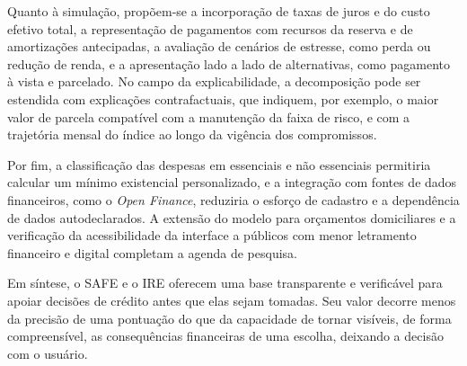 \documentclass[portuguese]{sbc2025}%
\begin{document}
Quanto à simulação, propõem-se a incorporação de taxas de juros e do custo efetivo total, a representação de pagamentos com recursos da reserva e de amortizações antecipadas, a avaliação de cenários de estresse, como perda ou redução de renda, e a apresentação lado a lado de alternativas, como pagamento à vista e parcelado. No campo da explicabilidade, a decomposição pode ser estendida com explicações contrafactuais, que indiquem, por exemplo, o maior valor de parcela compatível com a manutenção da faixa de risco, e com a trajetória mensal do índice ao longo da vigência dos compromissos.

Por fim, a classificação das despesas em essenciais e não essenciais permitiria calcular um mínimo existencial personalizado, e a integração com fontes de dados financeiros, como o \textit{Open Finance}, reduziria o esforço de cadastro e a dependência de dados autodeclarados. A extensão do modelo para orçamentos domiciliares e a verificação da acessibilidade da interface a públicos com menor letramento financeiro e digital completam a agenda de pesquisa.

Em síntese, o SAFE e o IRE oferecem uma base transparente e verificável para apoiar decisões de crédito antes que elas sejam tomadas. Seu valor decorre menos da precisão de uma pontuação do que da capacidade de tornar visíveis, de forma compreensível, as consequências financeiras de uma escolha, deixando a decisão com o usuário.
\end{document}
